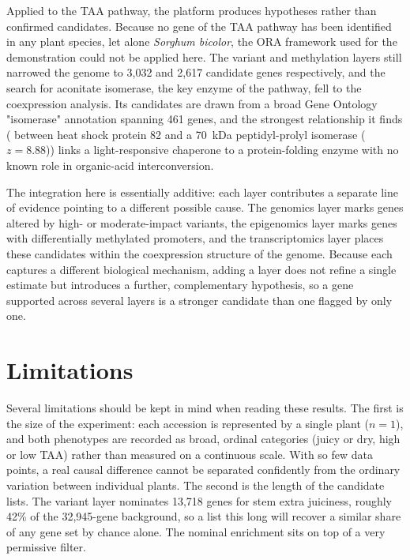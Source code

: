 \hspace{1em}Applied to the TAA pathway, the platform produces hypotheses rather than confirmed candidates. Because no gene of the TAA pathway has been identified in any plant species, let alone \textit{Sorghum bicolor}, the ORA framework used for the demonstration could not be applied here. The variant and methylation layers still narrowed the genome to 3,032 and 2,617 candidate genes respectively, and the search for aconitate isomerase, the key enzyme of the pathway, fell to the coexpression analysis. Its candidates are drawn from a broad Gene Ontology "isomerase" annotation spanning 461 genes, and the strongest relationship it finds ( between heat shock protein 82 and a 70~kDa peptidyl-prolyl isomerase ($z = 8.88$)) links a light-responsive chaperone to a protein-folding enzyme with no known role in organic-acid interconversion.

\hspace{1em}The integration here is essentially additive: each layer contributes a separate line of evidence pointing to a different possible cause. The genomics layer marks genes altered by high- or moderate-impact variants, the epigenomics layer marks genes with differentially methylated promoters, and the transcriptomics layer places these candidates within the coexpression structure of the genome. Because each captures a different biological mechanism, adding a layer does not refine a single estimate but introduces a further, complementary hypothesis, so a gene supported across several layers is a stronger candidate than one flagged by only one.

\section{Limitations}
\hspace{1em}Several limitations should be kept in mind when reading these results. The first is the size of the experiment: each accession is represented by a single plant ($n = 1$), and both phenotypes are recorded as broad, ordinal categories (juicy or dry, high or low TAA) rather than measured on a continuous scale. With so few data points, a real causal difference cannot be separated confidently from the ordinary variation between individual plants. The second is the length of the candidate lists. The variant layer nominates 13,718 genes for stem extra juiciness, roughly 42\% of the 32,945-gene background, so a list this long will recover a similar share of any gene set by chance alone. The nominal enrichment sits on top of a very permissive filter.

